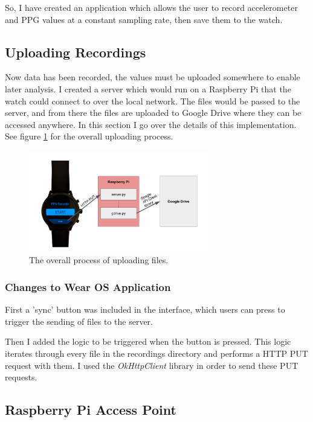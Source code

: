 \documentclass[12pt,a4paper,twoside,openright]{report}
\begin{document}
So, I have created an application which allows the user to record
accelerometer and PPG values at a constant sampling rate, then save them to
the watch.

\subsection{Uploading Recordings}

Now data has been recorded, the values must be uploaded somewhere to enable
later analysis. I created a server which would run on a Raspberry Pi that the
watch could connect to over the local network. The files would be passed to
the server, and from there the files are uploaded to Google Drive where they
can be accessed anywhere. In this section I go over the details of this
implementation. See figure \ref{fig:upload} for the overall uploading process.

\begin{figure}[tbh]
	\centerline{\includegraphics[width=0.7\textwidth]{figs/upload.png}}
	\caption{The overall process of uploading files.}
	\label{fig:upload}
\end{figure}

\subsubsection{Changes to Wear OS Application}

First a 'sync' button was included in the interface, which users can press to
trigger the sending of files to the server.

Then I added the logic to be triggered when the button is pressed. This logic
iterates through every file in the recordings directory and performs a HTTP
PUT request with them. I used the \emph{OkHttpClient} library in order to
send these PUT requests.

\subsection{Raspberry Pi Access Point}
\end{document}
